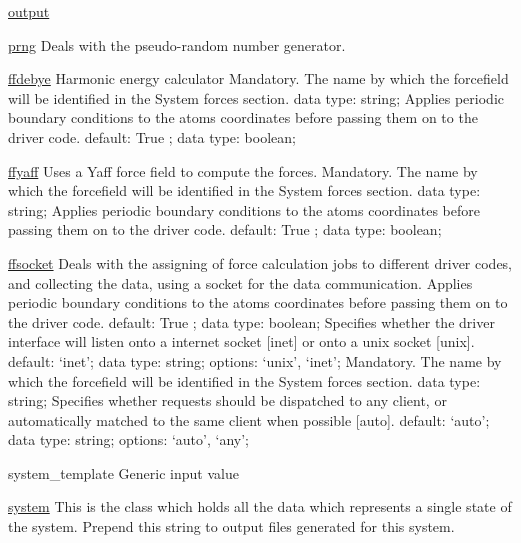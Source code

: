 \begin{ipifield}{}
\begin{ipifield}{\hyperref[OUTPUTS]{output}}
{}
\end{ipifield}
\begin{ipifield}{\hyperref[PRNG]{prng}}%
{Deals with the pseudo-random number generator.}%
{}%
{}
\end{ipifield}
\begin{ipifield}{\hyperref[FFDEBYE]{ffdebye}}%
{Harmonic energy calculator }%
{}%
{%
{Mandatory. The name by which the forcefield will be identified in the System forces section.}%
{data type: string; }%
%
{Applies periodic boundary conditions to the atoms coordinates before passing them on to the driver code.}%
{default:  True ; data type: boolean; }%
}
\end{ipifield}
\begin{ipifield}{\hyperref[FFYAFF]{ffyaff}}%
{Uses a Yaff force field to compute the forces.}%
{}%
{%
{Mandatory. The name by which the forcefield will be identified in the System forces section.}%
{data type: string; }%
%
{Applies periodic boundary conditions to the atoms coordinates before passing them on to the driver code.}%
{default:  True ; data type: boolean; }%
}
\end{ipifield}
\begin{ipifield}{\hyperref[FFSOCKET]{ffsocket}}%
{Deals with the assigning of force calculation jobs to different driver codes, and collecting the data, using a socket for the data communication.}%
{}%
{%
{Applies periodic boundary conditions to the atoms coordinates before passing them on to the driver code.}%
{default:  True ; data type: boolean; }%
%
{Specifies whether the driver interface will listen onto a internet socket [inet] or onto a unix socket [unix].}%
{default: `inet'; data type: string; options: `unix', `inet'; }%
%
{Mandatory. The name by which the forcefield will be identified in the System forces section.}%
{data type: string; }%
%
{Specifies whether requests should be dispatched to any client, or automatically matched to the same client when possible [auto].}%
{default: `auto'; data type: string; options: `auto', `any'; }%
}
\end{ipifield}
\begin{ipifield}{system\_template}%
{Generic input value}%
{}%
{}
\end{ipifield}
\begin{ipifield}{\hyperref[SYSTEM]{system}}%
{This is the class which holds all the data which represents a single state of the system.}%
{}%
{%
{Prepend this string to output files generated for this system. }%
}
\end{ipifield}
\end{ipifield}

